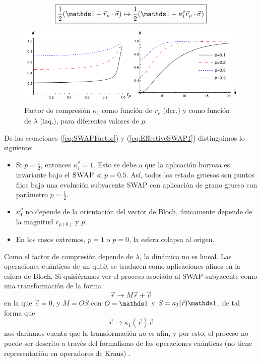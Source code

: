 \begin{equation}\label{eq:EffectiveSWAP1}
  \boxed{\frac{1}{2}(\Id+\vec{r}_{\rho}\cdot\vec{\sigma}) \mapsto \frac{1}{2}(\Id+\kappa_{1}^{\rho}\vec{r}_{\rho}\cdot\vec{\sigma})}
\end{equation}
\begin{figure}[h!]
  \centering
  \includegraphics[width=0.9\linewidth]{chapter3/figures_toy/ContractionFactorSWAP_2D_both.png}
  \caption{Factor de compresión $\kappa_{1}$ como función de $r_{\rho}$ (der.) y como función de $\lambda$ (izq.), para diferentes valores de $p$.}
  \label{fig:SWAPFactor2Drl}
\end{figure}

De las ecuaciones (\ref{eq:SWAPFactor}) y (\ref{eq:EffectiveSWAP1}) distinguimos lo siguiente:
\begin{itemize}
  \item Si $p=\frac{1}{2}$, entonces $\kappa_{1}^{\rho}=1$. Esto se debe a que la aplicación borrosa es invariante bajo el $\textsc{SWAP}$ si $p=0.5$. Así, todos los estado gruesos son puntos fijos bajo una evolución subyacente SWAP con aplicación de grano grueso con parámetro $p=\frac{1}{2}$.
  \item $\kappa_{1}^{\rho}$ no depende de la orientación del vector de Bloch, únicamente depende de la magnitud $r_{\rho(0)}$ y $p$.
  \item En los casos extremos, $p=1$ o $p=0$, la esfera colapsa al origen.
\end{itemize}


Como el factor de compresión depende de $\lambda$, la dinámica no es lineal. Las operaciones cuánticas de un qubit se traducen como aplicaciones afines en la esfera de Bloch. Si quisiéramos ver el proceso asociado al \textsc{SWAP} subyacente como una transformación de la forma
\begin{equation*}
  \vec{r}\rightarrow M\vec{r}+\vec{c}
\end{equation*}
en la que $\vec{c}=0$, y $M=OS$ con $O=\Id$ y $S=\kappa_{1}(\vec{r})\Id$, de tal forma que
\begin{equation*}
  \vec{r}\rightarrow \kappa_{1}(\vec{r})\vec{r}
\end{equation*}
nos daríamos cuenta que la transformación no es afín, y por esto, el proceso no puede ser descrito a través del formalismo de las operaciones cuánticas (no tiene representación en operadores de Kraus) \cite{Chuang}.

